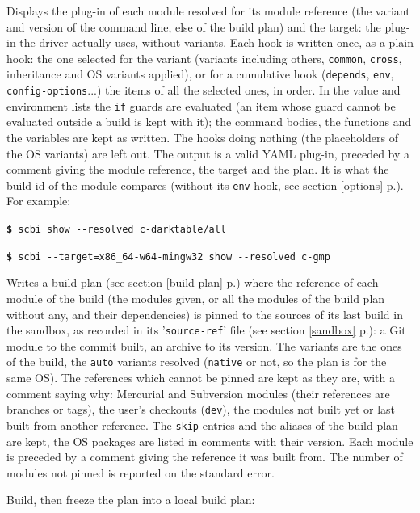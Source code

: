 \documentclass[a4paper,12pt,twoside]{article}
\newcommand{\code}[1]{\texttt{#1}}
\newcommand{\seeref}[1]{see section \ref{#1} p.\pageref{#1}}
\newcommand{\file}[1]{'{\texttt{#1}}'}
\newcommand{\cmd}[1]{\tabto{1cm}\hspace{0.5cm}\texttt{\textbf{\$} #1}}
\newcommand{\ddash}{-{}-}
\begin{document}
\begin{description}[font=\texttt]
	\item[\ddash{}resolved] Displays the plug-in of each module resolved for its module reference (the variant and version of the command line, else of the build plan) and the target: the plug-in the driver actually uses, without variants. Each hook is written once, as a plain hook: the one selected for the variant (variants including others, \code{common}, \code{cross}, inheritance and OS variants applied), or for a cumulative hook (\code{depends}, \code{env}, \code{config-options}...) the items of all the selected ones, in order. In the value and environment lists the \code{if} guards are evaluated (an item whose guard cannot be evaluated outside a build is kept with it); the command bodies, the functions and the variables are kept as written. The hooks doing nothing (the placeholders of the OS variants) are left out. The output is a valid YAML plug-in, preceded by a comment giving the module reference, the target and the plan. It is what the build id of the module compares (without its \code{env} hook, \seeref{options}). For example:

	\cmd{scbi show \ddash{}resolved c-darktable/all}

	\cmd{scbi \ddash{}target=x86\_64-w64-mingw32 show \ddash{}resolved c-gmp}

	\item[\ddash{}freeze] Writes a build plan (\seeref{build-plan}) where the reference of each module of the build (the modules given, or all the modules of the build plan without any, and their dependencies) is pinned to the sources of its last build in the sandbox, as recorded in its \file{source-ref} file (\seeref{sandbox}): a Git module to the commit built, an archive to its version. The variants are the ones of the build, the \code{auto} variants resolved (\code{native} or not, so the plan is for the same OS). The references which cannot be pinned are kept as they are, with a comment saying why: Mercurial and Subversion modules (their references are branches or tags), the user's checkouts (\code{dev}), the modules not built yet or last built from another reference. The \code{skip} entries and the aliases of the build plan are kept, the OS packages are listed in comments with their version. Each module is preceded by a comment giving the reference it was built from. The number of modules not pinned is reported on the standard error.

	Build, then freeze the plan into a local build plan:


\end{description}
\end{document}
